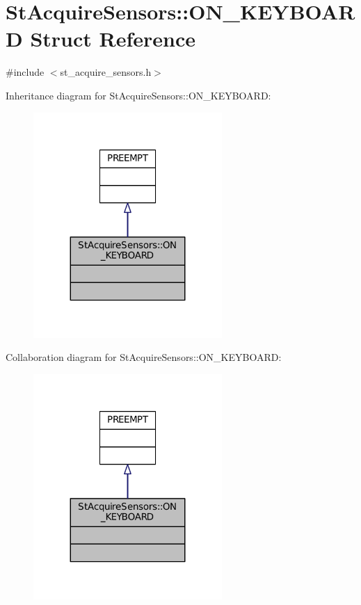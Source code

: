 \hypertarget{structStAcquireSensors_1_1ON__KEYBOARD}{}\section{St\+Acquire\+Sensors\+:\+:O\+N\+\_\+\+K\+E\+Y\+B\+O\+A\+RD Struct Reference}
\label{structStAcquireSensors_1_1ON__KEYBOARD}


{\ttfamily \#include $<$st\+\_\+acquire\+\_\+sensors.\+h$>$}



Inheritance diagram for St\+Acquire\+Sensors\+:\+:O\+N\+\_\+\+K\+E\+Y\+B\+O\+A\+RD\+:
\nopagebreak
\begin{figure}[H]
\begin{center}
\leavevmode
\includegraphics[width=203pt]{structStAcquireSensors_1_1ON__KEYBOARD__inherit__graph}
\end{center}
\end{figure}


Collaboration diagram for St\+Acquire\+Sensors\+:\+:O\+N\+\_\+\+K\+E\+Y\+B\+O\+A\+RD\+:
\nopagebreak
\begin{figure}[H]
\begin{center}
\leavevmode
\includegraphics[width=203pt]{structStAcquireSensors_1_1ON__KEYBOARD__coll__graph}
\end{center}
\end{figure}


